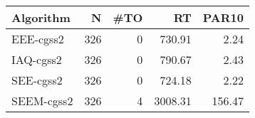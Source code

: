 \begin{tabular}{lrrrr}
\toprule
 Algorithm &   N &  \#TO &      RT &  PAR10 \\
\midrule
 EEE-cgss2 & 326 &    0 &  730.91 &   2.24 \\
 IAQ-cgss2 & 326 &    0 &  790.67 &   2.43 \\
 SEE-cgss2 & 326 &    0 &  724.18 &   2.22 \\
SEEM-cgss2 & 326 &    4 & 3008.31 & 156.47 \\
\bottomrule
\end{tabular}
